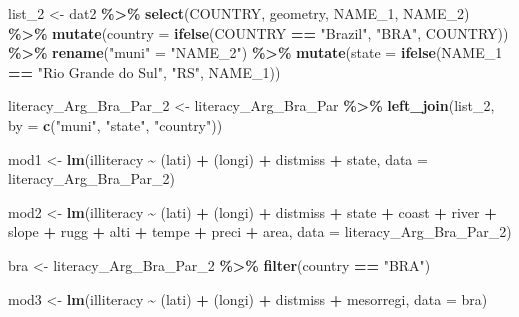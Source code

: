 \documentclass[
  a4paper,
]{article}
\newenvironment{Shaded}{\begin{snugshade}}{\end{snugshade}}
\newcommand{\AttributeTok}[1]{\textcolor[rgb]{0.13,0.29,0.53}{#1}}
\newcommand{\FunctionTok}[1]{\textcolor[rgb]{0.13,0.29,0.53}{\textbf{#1}}}
\newcommand{\NormalTok}[1]{#1}
\newcommand{\OtherTok}[1]{\textcolor[rgb]{0.56,0.35,0.01}{#1}}
\newcommand{\SpecialCharTok}[1]{\textcolor[rgb]{0.81,0.36,0.00}{\textbf{#1}}}
\newcommand{\StringTok}[1]{\textcolor[rgb]{0.31,0.60,0.02}{#1}}
\begin{document}
\begin{Shaded}
\begin{Highlighting}[]
\NormalTok{list\_2 }\OtherTok{\textless{}{-}}\NormalTok{ dat2 }\SpecialCharTok{\%\textgreater{}\%}
  \FunctionTok{select}\NormalTok{(COUNTRY, geometry, NAME\_1, NAME\_2) }\SpecialCharTok{\%\textgreater{}\%}
  \FunctionTok{mutate}\NormalTok{(}\AttributeTok{country =} \FunctionTok{ifelse}\NormalTok{(COUNTRY }\SpecialCharTok{==} \StringTok{"Brazil"}\NormalTok{, }\StringTok{"BRA"}\NormalTok{, COUNTRY)) }\SpecialCharTok{\%\textgreater{}\%}
  \FunctionTok{rename}\NormalTok{(}\StringTok{"muni"} \OtherTok{=} \StringTok{"NAME\_2"}\NormalTok{) }\SpecialCharTok{\%\textgreater{}\%}
  \FunctionTok{mutate}\NormalTok{(}\AttributeTok{state =} \FunctionTok{ifelse}\NormalTok{(NAME\_1 }\SpecialCharTok{==} \StringTok{"Rio Grande do Sul"}\NormalTok{, }\StringTok{"RS"}\NormalTok{, NAME\_1)) }

\NormalTok{literacy\_Arg\_Bra\_Par\_2 }\OtherTok{\textless{}{-}}\NormalTok{ literacy\_Arg\_Bra\_Par }\SpecialCharTok{\%\textgreater{}\%}
  \FunctionTok{left\_join}\NormalTok{(list\_2, }\AttributeTok{by =} \FunctionTok{c}\NormalTok{(}\StringTok{"muni"}\NormalTok{,  }\StringTok{"state"}\NormalTok{, }\StringTok{"country"}\NormalTok{))}

\NormalTok{mod1 }\OtherTok{\textless{}{-}} \FunctionTok{lm}\NormalTok{(illiteracy }\SpecialCharTok{\textasciitilde{}}\NormalTok{ (lati) }\SpecialCharTok{+}\NormalTok{ (longi) }\SpecialCharTok{+}\NormalTok{ distmiss }\SpecialCharTok{+}\NormalTok{ state, }\AttributeTok{data =}\NormalTok{ literacy\_Arg\_Bra\_Par\_2)}

\NormalTok{mod2 }\OtherTok{\textless{}{-}} \FunctionTok{lm}\NormalTok{(illiteracy }\SpecialCharTok{\textasciitilde{}}\NormalTok{ (lati) }\SpecialCharTok{+}\NormalTok{ (longi) }\SpecialCharTok{+}\NormalTok{ distmiss }\SpecialCharTok{+}\NormalTok{ state }\SpecialCharTok{+}\NormalTok{ coast }\SpecialCharTok{+}\NormalTok{ river }\SpecialCharTok{+}\NormalTok{ slope }\SpecialCharTok{+}\NormalTok{ rugg }\SpecialCharTok{+}\NormalTok{ alti }\SpecialCharTok{+}\NormalTok{ tempe }\SpecialCharTok{+}\NormalTok{ preci }\SpecialCharTok{+}\NormalTok{ area, }\AttributeTok{data =}\NormalTok{ literacy\_Arg\_Bra\_Par\_2)}


\NormalTok{bra }\OtherTok{\textless{}{-}}\NormalTok{ literacy\_Arg\_Bra\_Par\_2 }\SpecialCharTok{\%\textgreater{}\%} 
             \FunctionTok{filter}\NormalTok{(country }\SpecialCharTok{==} \StringTok{"BRA"}\NormalTok{)}

\NormalTok{mod3 }\OtherTok{\textless{}{-}} \FunctionTok{lm}\NormalTok{(illiteracy }\SpecialCharTok{\textasciitilde{}}\NormalTok{ (lati) }\SpecialCharTok{+}\NormalTok{ (longi) }\SpecialCharTok{+}\NormalTok{ distmiss }\SpecialCharTok{+}\NormalTok{ mesorregi, }\AttributeTok{data =}\NormalTok{ bra)}


\end{Highlighting}
\end{Shaded}
\end{document}
